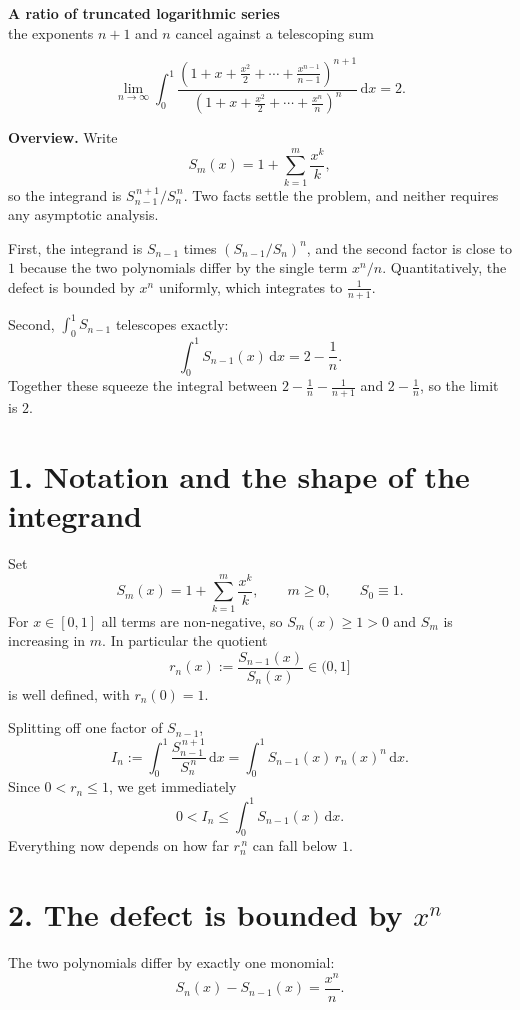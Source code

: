 \documentclass[12pt]{article}
\newcommand{\dd}{\,\mathrm{d}}
\newcommand{\In}{I_n}
\begin{document}
\begin{center}
{\Large\bfseries A ratio of truncated logarithmic series}\\[0.35em]
{\large the exponents \(n+1\) and \(n\) cancel against a telescoping sum}
\end{center}

\[
\boxed{\displaystyle
\lim_{n\to\infty}\int_0^1
\frac{\left(1+x+\frac{x^2}{2}+\cdots+\frac{x^{n-1}}{n-1}\right)^{n+1}}
     {\left(1+x+\frac{x^2}{2}+\cdots+\frac{x^{n}}{n}\right)^{n}}
\dd x
=2 .}
\]

\textbf{Overview.}
Write
\[
S_m(x)=1+\sum_{k=1}^{m}\frac{x^k}{k},
\]
so the integrand is \(S_{n-1}^{\,n+1}/S_n^{\,n}\). Two facts settle the
problem, and neither requires any asymptotic analysis.

First, the integrand is \(S_{n-1}\) times \((S_{n-1}/S_n)^n\), and the
second factor is close to \(1\) because the two polynomials differ by the
single term \(x^n/n\). Quantitatively, the defect is bounded by \(x^n\)
uniformly, which integrates to \(\frac1{n+1}\).

Second, \(\int_0^1 S_{n-1}\) telescopes exactly:
\[
\int_0^1 S_{n-1}(x)\dd x=2-\frac1n .
\]
Together these squeeze the integral between \(2-\frac1n-\frac1{n+1}\) and
\(2-\frac1n\), so the limit is \(2\).

\section*{1. Notation and the shape of the integrand}

Set
\[
S_m(x)=1+\sum_{k=1}^{m}\frac{x^k}{k},\qquad m\ge0,\qquad S_0\equiv1 .
\]
For \(x\in[0,1]\) all terms are non-negative, so \(S_m(x)\ge1>0\) and
\(S_m\) is increasing in \(m\). In particular the quotient
\[
r_n(x):=\frac{S_{n-1}(x)}{S_n(x)}\in(0,1]
\tag{1}
\]
is well defined, with \(r_n(0)=1\).

Splitting off one factor of \(S_{n-1}\),
\[
\In:=\int_0^1\frac{S_{n-1}^{\,n+1}}{S_n^{\,n}}\dd x
=\int_0^1 S_{n-1}(x)\,r_n(x)^n\dd x .
\tag{2}
\]
Since \(0<r_n\le1\), we get immediately
\[
0<\In\le\int_0^1 S_{n-1}(x)\dd x .
\tag{3}
\]
Everything now depends on how far \(r_n^{\,n}\) can fall below \(1\).

\section*{2. The defect is bounded by \(x^n\)}

The two polynomials differ by exactly one monomial:
\[
S_n(x)-S_{n-1}(x)=\frac{x^n}{n}.
\tag{4}
\]
\end{document}

